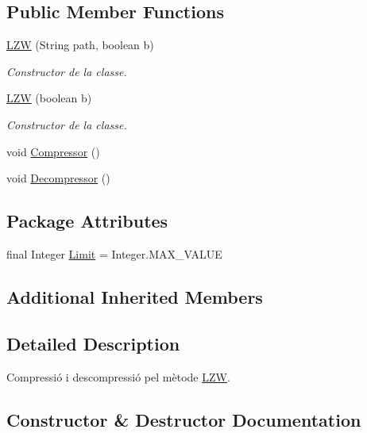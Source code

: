 \subsection*{Public Member Functions}
\begin{DoxyCompactItemize}
\item 
\hyperlink{classdomini_1_1algorithm_1_1LZW_ab596afb13b224da41ee590a08df642a9}{L\+ZW} (String path, boolean b)
\begin{DoxyCompactList}\small\item\em Constructor de la classe. \end{DoxyCompactList}\item 
\hyperlink{classdomini_1_1algorithm_1_1LZW_ad8feac199454cb47321930e6d737360e}{L\+ZW} (boolean b)
\begin{DoxyCompactList}\small\item\em Constructor de la classe. \end{DoxyCompactList}\item 
void \hyperlink{classdomini_1_1algorithm_1_1LZW_a04a13292c78f6d958270fec8bc6975be}{Compressor} ()
\item 
void \hyperlink{classdomini_1_1algorithm_1_1LZW_a6a5d986396443691861ac9ba41b2dd33}{Decompressor} ()
\end{DoxyCompactItemize}
\subsection*{Package Attributes}
\begin{DoxyCompactItemize}
\item 
final Integer \hyperlink{classdomini_1_1algorithm_1_1LZW_a6d83dbcda4939db767fa0522d40fcc0a}{Limit} = Integer.\+M\+A\+X\+\_\+\+V\+A\+L\+UE
\end{DoxyCompactItemize}
\subsection*{Additional Inherited Members}


\subsection{Detailed Description}
Compressió i descompressió pel mètode \hyperlink{classdomini_1_1algorithm_1_1LZW}{L\+ZW}. 

\subsection{Constructor \& Destructor Documentation}
\mbox{\label{classdomini_1_1algorithm_1_1LZW_ab596afb13b224da41ee590a08df642a9}} 

